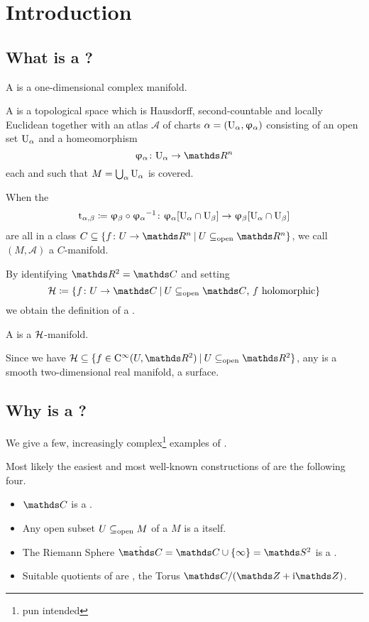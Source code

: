 \chapter{Introduction}

\section{What is a \RS?}

A \RS is a one-dimensional complex manifold.

\begin{defi}
	A  is a topological space
	which is Hausdorff, second-countable and locally Euclidean
	together with an atlas \(\mathcal A\)
	of charts \(\alpha = (\textup{U}_{\alpha}, \upvarphi_{\alpha})\)
	consisting of an open set \(\textup{U}_{\alpha}\)
	and a homeomorphism
	\[\uphi\alpha\colon \U\alpha \to \R^n\]
	each and
	such that \(M = \bigcup_\alpha \textup{U}_{\alpha}\) is covered.

	When the 
	\begin{align*}
		\textup{t}_{\alpha, \beta}
		\coloneqq \upvarphi_{\beta}\circ{\upvarphi_{\alpha}}^{-1}
		\colon
		    \upvarphi_{\alpha}[\textup{U}_{\alpha}\cap\textup{U}_{\beta}]
	        \to \upvarphi_{\beta} [\textup{U}_{\alpha}\cap\textup{U}_{\beta}]
	\end{align*}
	are all in a class
	\(C \subseteq \{f\colon U \to \R^n \:\vert\: U \subsetopen \R^n\}\),
	we call \((M, \mathcal A)\) a \(C\)-manifold.
\end{defi}

By identifying \(\R^2 = \C\)
and setting
\[	\Hol \coloneqq
	\{f\colon U \to \C \:\vert\:
		\text{\(U \subsetopen \C\),
		\(f\) holomorphic}
	\}
\]
we obtain the definition of a \RS.

\begin{defi}
	A  is a \(\mathcal{H}\)-manifold.
\end{defi}

Since we have
\(\Hol \subset \{f \in \smooth(U, \R^2) \:\vert\: U \subsetopen \R^2\}\),
any \RS is a smooth two-dimensional real manifold,
\ie a surface.

\section{Why is a \RS?}

We give a few, increasingly complex\footnote{pun intended}
examples of \RSs.

\begin{bsp}
Most likely the easiest and most well-known constructions of \RSs
are the following four.
\begin{itemize}
\item \(\C\) is a \RS.
\item Any open subset \(U \subseteq_{\textnormal{open}} M\) of a \RS \(M\) is a \RS itself.
\item The Riemann Sphere \(\hat\C = \C \cup \{\infty\} = \S^2\) is a \RS.
\item Suitable quotients of \RSs are \RSs,
	\eg the Torus \(\C / (\Z + \i\Z)\).
\end{itemize}
\end{bsp}

